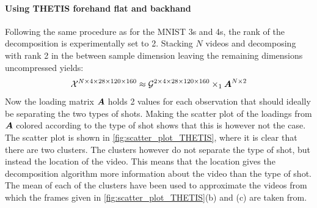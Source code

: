 \paragraph{Using THETIS forehand flat and backhand}
Following the same procedure as for the MNIST 3s and 4s, the rank of the decomposition is experimentally set to 2. Stacking $N$ videos and decomposing with rank 2 in the between sample dimension leaving the remaining dimensions uncompressed yields:
\begin{equation}
    \mathcal{X}^{N\times 4 \times 28 \times 120 \times 160} \approx \mathcal{G}^{2 \times 4 \times 28 \times 120 \times 160} \times_1 \boldsymbol{A}^{N\times 2}
\end{equation}
Now the loading matrix $\boldsymbol{A}$ holds 2 values for each observation that should ideally be separating the two types of shots. Making the scatter plot of the loadings from $\boldsymbol{A}$ colored according to the type of shot shows that this is however not the case. The scatter plot is shown in \autoref{fig:scatter_plot_THETIS}, where it is clear that there are two clusters. The clusters however do not separate the type of shot, but instead the location of the video. This means that the location gives the decomposition algorithm more information about the video than the type of shot. The mean of each of the clusters have been used to approximate the videos from which the frames given in \autoref{fig:scatter_plot_THETIS}(b) and (c) are taken from.
